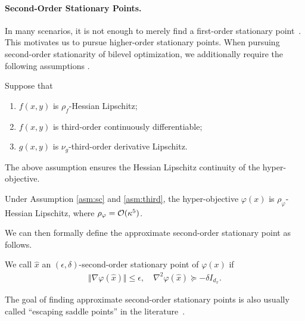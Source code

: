 \documentclass{article}
\begin{document}
\paragraph{Second-Order Stationary Points. }In many scenarios, it is not enough to merely find a first-order stationary point~\cite{goodfellow2014qualitatively,dauphin2014identifying,choromanska2015loss}. This motivates us to pursue higher-order stationary points.
When pursuing second-order stationarity of bilevel optimization, we additionally require the following assumptions \cite{huang2022efficiently}. 
\begin{asm} \label{asm:third}
Suppose that
\begin{enumerate}
    \item $f(x,y)$ is $\rho_f$-Hessian Lipschitz;
    \item $f(x,y)$ is third-order  continuously differentiable;
    \item  $ g(x,y)$ is $\nu_g$-third-order derivative Lipschitz.
\end{enumerate}
\end{asm}
The above assumption ensures the Hessian Lipschitz continuity of the hyper-objective.
\begin{prop}
    Under Assumption \ref{asm:sc} and \ref{asm:third}, the hyper-objective $\varphi(x)$ is $\rho_\varphi$-Hessian Lipschitz, where $\rho_\varphi = {\mathcal{O}}(\kappa^5)$.
\end{prop}

We can then formally define the
 approximate second-order stationary point as follows.
\begin{dfn} \label{dfn:sta-hyper-second}
We call $\hat x$ an $(\epsilon,\delta)$-second-order stationary point of $\varphi(x)$ if 
\begin{align*}
    \Vert \nabla \varphi(\hat x) \Vert \le \epsilon,\quad  \nabla^2 \varphi(\hat x)  \succeq -\delta I_{d_x}.
\end{align*}
\end{dfn}

The goal of finding approximate second-order stationary points is also usually called ``escaping saddle points'' in the literature~\cite{jin2017escape,ge2015escaping,li2022restarted,fang2019sharp,nesterov2006cubic,tripuraneni2018stochastic,agarwal2017finding,lee2016gradient,allen2018neon2,carmon2017convex,zhou2020stochastic,allen2018natasha,xu2018first}.
\end{document}
